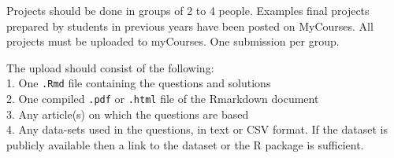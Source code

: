 \documentclass[letterpaper,12pt,twoside,]{pinp}
\begin{document}
\vspace*{.3in}

Projects should be done in groups of 2 to 4 people. Examples final
projects prepared by students in previous years have been posted on
MyCourses. All projects must be uploaded to myCourses. One submission
per group.

\vspace*{.3in}

The upload should consist of the following:\\
1. One \texttt{.Rmd} file containing the questions and solutions\\
2. One compiled \texttt{.pdf} or \texttt{.html} file of the Rmarkdown
document\\
3. Any article(s) on which the questions are based\\
4. Any data-sets used in the questions, in text or CSV format. If the
dataset is publicly available then a link to the dataset or the R
package is sufficient.





\end{document}
